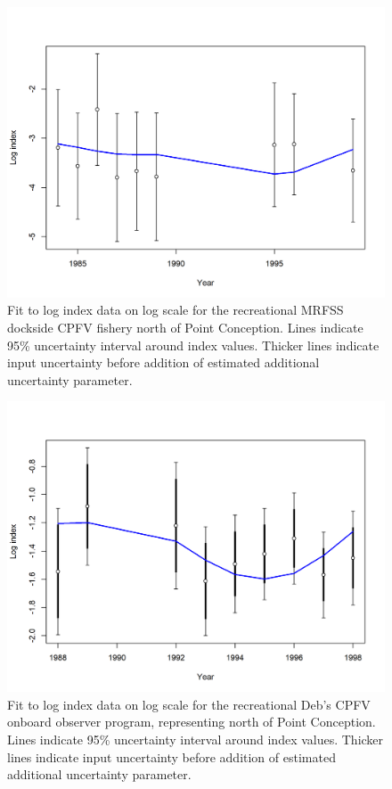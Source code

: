 \documentclass[12pt,]{article}
\begin{document}
\FloatBarrier 

\begin{figure}
\centering
\includegraphics{r4ss/plots_mod1/index5_logcpuefit_RecDocksideNorth.png}
\caption{Fit to log index data on log scale for the recreational MRFSS
dockside CPFV fishery north of Point Conception. Lines indicate 95\%
uncertainty interval around index values. Thicker lines indicate input
uncertainty before addition of estimated additional uncertainty
parameter. \label{fig:index5_logcpuefit_RecDocksideNorth}}
\end{figure}

\FloatBarrier

\begin{figure}
\centering
\includegraphics{r4ss/plots_mod1/index5_logcpuefit_DebCPFV.png}
\caption{Fit to log index data on log scale for the recreational Deb's
CPFV onboard observer program, representing north of Point Conception.
Lines indicate 95\% uncertainty interval around index values. Thicker
lines indicate input uncertainty before addition of estimated additional
uncertainty parameter. \label{fig:index5_logcpuefit_DebCPFV}}
\end{figure}
\end{document}
